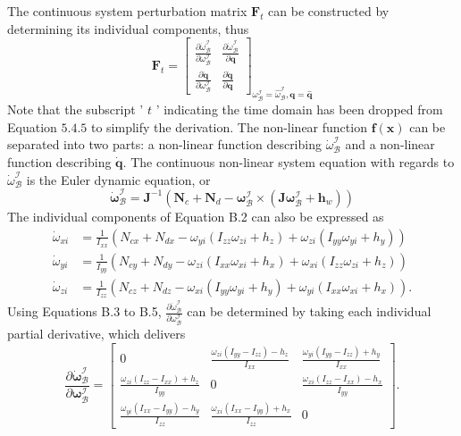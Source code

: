 The continuous system perturbation matrix $\mathbf{F}_{t}$ can be constructed by determining its individual components, thus
$$
\mathbf{F}_{t}=\left[\begin{array}{ll}
\frac{\partial \dot{\omega}_{\mathcal{B}}^{\mathcal{I}}}{\partial \omega_{\mathcal{B}}^{\mathcal{I}}} & \frac{\partial \dot{\omega}_{\mathcal{B}}^{\mathcal{I}}}{\partial \mathbf{q}} \\
\frac{\partial \dot{\mathbf{q}}}{\partial \omega_{\mathcal{B}}^{\mathcal{I}}} & \frac{\partial \dot{\mathbf{q}}}{\partial \mathbf{q}}
\end{array}\right]_{\omega_{\mathcal{B}}^{\mathcal{I}}=\hat{\omega}_{\mathcal{B}}^{\mathcal{I}}, \mathbf{q}=\hat{\mathbf{q}}}
$$
Note that the subscript ' $t$ ' indicating the time domain has been dropped from Equation $5.4 .5$ to simplify the derivation. The non-linear function $\boldsymbol{f}(\mathbf{x})$ can be separated into two parts: a non-linear function describing $\dot{\omega}_{\mathcal{B}}^{\mathcal{I}}$ and a non-linear function describing $\dot{\mathbf{q}}$. The continuous non-linear system equation with regards to $\dot{\omega}_{\mathcal{B}}^{\mathcal{I}}$ is the Euler dynamic equation, or
$$
\dot{\boldsymbol{\omega}}_{\mathcal{B}}^{\mathcal{I}}=\mathbf{J}^{-1}\left(\mathbf{N}_{c}+\mathbf{N}_{d}-\boldsymbol{\omega}_{\mathcal{B}}^{\mathcal{I}} \times\left(\mathbf{J} \boldsymbol{\omega}_{\mathcal{B}}^{\mathcal{I}}+\mathbf{h}_{w}\right)\right)
$$
The individual components of Equation B.2 can also be expressed as
$$
\begin{aligned}
\dot{\omega}_{x i} &=\frac{1}{I_{x x}}\left(N_{c x}+N_{d x}-\omega_{y i}\left(I_{z z} \omega_{z i}+h_{z}\right)+\omega_{z i}\left(I_{y y} \omega_{y i}+h_{y}\right)\right) \\
\dot{\omega}_{y i} &=\frac{1}{I_{y y}}\left(N_{c y}+N_{d y}-\omega_{z i}\left(I_{x x} \omega_{x i}+h_{x}\right)+\omega_{x i}\left(I_{z z} \omega_{z i}+h_{z}\right)\right) \\
\dot{\omega}_{z i} &=\frac{1}{I_{z z}}\left(N_{c z}+N_{d z}-\omega_{x i}\left(I_{y y} \omega_{y i}+h_{y}\right)+\omega_{y i}\left(I_{x x} \omega_{x i}+h_{x}\right)\right) .
\end{aligned}
$$
Using Equations B.3 to B.5, $\frac{\partial \dot{\omega}_{\mathcal{B}}^{\mathcal{I}}}{\partial \omega_{\mathcal{B}}^{\mathcal{I}}}$ can be determined by taking each individual partial derivative, which delivers
$$
\frac{\partial \dot{\boldsymbol{\omega}}_{\mathcal{B}}^{\mathcal{I}}}{\partial \boldsymbol{\omega}_{\mathcal{B}}^{\mathcal{I}}}=\left[\begin{array}{ccc}
0 & \frac{\omega_{z i}\left(I_{y y}-I_{z z}\right)-h_{z}}{I_{x x}} & \frac{\omega_{y i}\left(I_{y y}-I_{z z}\right)+h_{y}}{I_{x x}} \\
\frac{\omega_{z i}\left(I_{z z}-I_{x x}\right)+h_{z}}{I_{y y}} & 0 & \frac{\omega_{x i}\left(I_{z z}-I_{x x}\right)-h_{x}}{I_{y y}} \\
\frac{\omega_{y i}\left(I_{x x}-I_{y y}\right)-h_{y}}{I_{z z}} & \frac{\omega_{x i}\left(I_{x x}-I_{y y}\right)+h_{x}}{I_{z z}} & 0
\end{array}\right] .
$$
